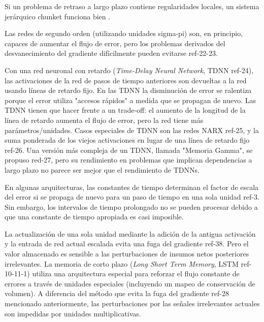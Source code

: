 Si un problema de retraso a largo plazo contiene regularidades locales, un sistema jerárquico chunket funciona bien \cite{Schmidhuber1992}.


Las redes de segundo orden (utilizando unidades sigma-pi) son, en principio, capaces de aumentar el flujo de error, pero los problemas derivados del desvanecimiento del gradiente difícilmente pueden evitarse ref-22-23.

Con una red neuronal con retardo ({\em Time-Delay Neural Network}, TDNN ref-24), las activaciones de la red de pasos de tiempo anteriores son devueltas a la red usando líneas de retardo fijo. En las TDNN la disminución de error se ralentiza porque el error utiliza "accesos rápidos" a medida que se propagan de nuevo. Las TDNN tienen que hacer frente a un trade-off: el aumento de la longitud de la línea de retardo aumenta el flujo de error, pero la red tiene más parámetros/unidades. Casos especiales de TDNN son las redes NARX ref-25, y la suma ponderada de los viejos activaciones en lugar de una línea de retardo fijo ref-26. Una versión más compleja de un TDNN, llamada "Memoria Gamma", se propuso red-27, pero su rendimiento en problemas que implican dependencias a largo plazo no parece ser mejor que el rendimiento de TDNNs.

En algunas arquitecturas, las constantes de tiempo determinan el factor de escala del error si se propaga de nuevo para un paso de tiempo en una sola unidad ref-3. Sin embargo, los intervalos de tiempo prolongado no se pueden procesar debido a que una constante de tiempo apropiada es casi imposible.

La actualización de una sola unidad mediante la adición de la antigua activación y la entrada de red actual escalada evita una fuga del gradiente ref-38. Pero el valor almacenado es sensible a las perturbaciones de insumos netos posteriores irrelevantes. La memoria de corto plazo ({\em Long Short Term Memory}, LSTM ref-10-11-1) utiliza una arquitectura especial para reforzar el flujo constante de errores a través de unidades especiales (incluyendo un mapeo de conservación de volumen). A diferencia del método que evita la fuga del gradiente ref-28 mencionado anteriormente, las perturbaciones por las señales irrelevantes actuales son impedidas por unidades multiplicativas.

